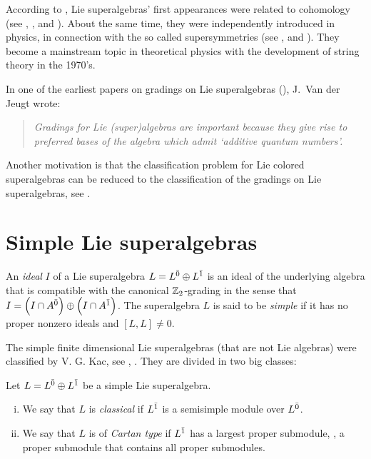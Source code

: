 According to \cite{Freund:1986ws}, Lie superalgebras' first appearances were related to cohomology (see  \cite{FN56}, \cite{Gen63}, \cite{Gen64} and \cite{MM65}). About the same time, they were independently introduced in physics, in connection with the so called supersymmetries (see \cite{GN64}, \cite{Miy68} and \cite{Mic69}). They become a mainstream topic in theoretical physics with the development of string theory in the 1970's.

In one of the earliest papers on gradings on Lie superalgebras (\cite{MR974693}), J.~Van der Jeugt wrote:

\begin{quote}\emph{Gradings for Lie (super)algebras are important because they give rise to preferred bases of the algebra which admit `additive quantum numbers'.}\end{quote}

Another motivation is that the classification problem for Lie colored superalgebras can be reduced to the classification of the gradings on Lie superalgebras, see \cite{MR2497949}.



\section{Simple Lie superalgebras}

An \emph{ideal} $I$ of a Lie superalgebra $L=L^{\bar0}\oplus L^{\bar1}$ is an ideal of the underlying algebra that is compatible with the canonical $\mathbb{Z}_{2}$-grading in the sense that $I=\left(I\cap A^{\bar0} \right) \oplus \left(I\cap A^{\bar1} \right)$. The superalgebra $L$ is said to be \emph{simple} if it has no proper nonzero ideals and $[L,L]\neq 0$.

The simple finite dimensional Lie superalgebras (that are not Lie algebras) were classified by V. G. Kac, see \cite{artigokac}, \cite{livrosuperalgebra}. They are divided in two big classes:

\begin{defi}
Let $L=L^{\bar0} \oplus L^{\bar1}$ be a simple Lie superalgebra. 
\begin{enumerate}[(i)]
\item We say that $L$ is \emph{classical} if $L^{\bar1}$ is a semisimple module over $L^{\bar0}$.
\item We say that $L$ is of \emph{Cartan type} if $L^{\bar1}$ has a largest proper submodule, \ie, a proper submodule that contains all proper submodules.
\end{enumerate}

\end{defi}

